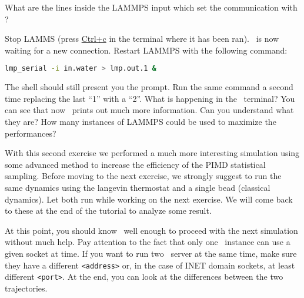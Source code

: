 \documentclass{article}
\begin{document}
\begin{Exercise}[label={inputs},title={Liquid water with the
    \emph{PIGLET} thermostat}]
What are the lines inside the LAMMPS input which set the communication
with \ipi ?

\Question
Stop LAMMS (press \url{Ctrl+c} in the terminal where it has been
ran). \ipi\ is now waiting for a new connection. Restart LAMMPS with
the following command:
\begin{lstlisting}[language=bash]
lmp_serial -i in.water > lmp.out.1 &
\end{lstlisting}
The shell should still present you the prompt. Run the same command a
second time replacing the last ``1'' with a ``2''. What is happening
in the \ipi\ terminal? You can see that now \ipi\ prints out much more
information. Can you understand what they are? How many instances of
LAMMPS could be used to maximize the performances?

\end{Exercise}

With this second exercise we performed a much more interesting
simulation using some advanced method to increase the efficiency of
the PIMD statistical sampling. Before moving to the next exercise, we
strongly suggest to run the same dynamics using the langevin thermostat and a
single bead (classical dynamics).
Let both run while working on the next exercise. We
will come back to these at the end of the tutorial to analyze some
result.

At this point, you should know \ipi\ well enough to
proceed with the next simulation without much help. Pay attention to
the fact that only one \ipi\ instance can use a given socket at
time. If you want to run two \ipi\ server at the same time, make sure
they have a different \texttt{<address>} or, in the case of INET domain
sockets, at least different \texttt{<port>}. At the end, you can look
at the differences between the two trajectories.

\vspace{2em}
\end{document}
